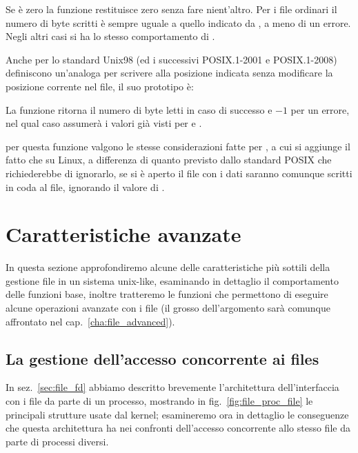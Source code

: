
Se  è zero la funzione restituisce zero senza fare nient'altro.
Per i file ordinari il numero di byte scritti è sempre uguale a quello
indicato da , a meno di un errore. Negli altri casi si ha lo
stesso comportamento di .

Anche per  lo standard Unix98 (ed i successivi POSIX.1-2001 e
POSIX.1-2008) definiscono un'analoga  per scrivere alla
posizione indicata senza modificare la posizione corrente nel file, il suo
prototipo è:

\begin{funcproto}{
}

{La funzione ritorna il numero di byte letti in caso di successo e $-1$ per un
  errore, nel qual caso  assumerà i valori già visti per
   e .}
\end{funcproto}

\noindent per questa funzione valgono le stesse considerazioni fatte per
, a cui si aggiunge il fatto che su Linux, a differenza di quanto
previsto dallo standard POSIX che richiederebbe di ignorarlo, se si è aperto
il file con  i dati saranno comunque scritti in coda al file,
ignorando il valore di .


\section{Caratteristiche avanzate}
\label{sec:file_adv_func}

In questa sezione approfondiremo alcune delle caratteristiche più sottili
della gestione file in un sistema unix-like, esaminando in dettaglio il
comportamento delle funzioni base, inoltre tratteremo le funzioni che
permettono di eseguire alcune operazioni avanzate con i file (il grosso
dell'argomento sarà comunque affrontato nel cap.~\ref{cha:file_advanced}).


\subsection{La gestione dell'accesso concorrente ai files}
\label{sec:file_shared_access}

In sez.~\ref{sec:file_fd} abbiamo descritto brevemente l'architettura
dell'interfaccia con i file da parte di un processo, mostrando in
fig.~\ref{fig:file_proc_file} le principali strutture usate dal kernel;
esamineremo ora in dettaglio le conseguenze che questa architettura ha nei
confronti dell'accesso concorrente allo stesso file da parte di processi
diversi.

